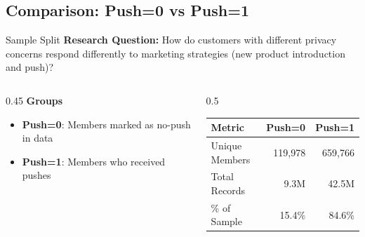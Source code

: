 \documentclass[aspectratio=169]{beamer}  %
\begin{document}
\subsection{Comparison: Push=0 vs Push=1}
\begin{frame}{Sample Split}
\textbf{Research Question:} How do customers with different privacy concerns respond differently to marketing strategies (new product introduction and push)?
\vspace{0.3cm}

\begin{columns}
\begin{column}{0.45\linewidth}
\textbf{Groups}
\begin{itemize}
    \item \textbf{Push=0}: Members marked as no-push in data
    \item \textbf{Push=1}: Members who received pushes
\end{itemize}
\end{column}
\begin{column}{0.5\linewidth}
\begin{table}
\centering\scriptsize
\begin{tabular}{lrr}
\toprule
\textbf{Metric} & \textbf{Push=0} & \textbf{Push=1} \\
\midrule
Unique Members & 119,978 & 659,766 \\
Total Records & 9.3M & 42.5M \\
\% of Sample & 15.4\% & 84.6\% \\
\bottomrule
\end{tabular}
\end{table}
\end{column}
\end{columns}
\end{frame}
\end{document}
